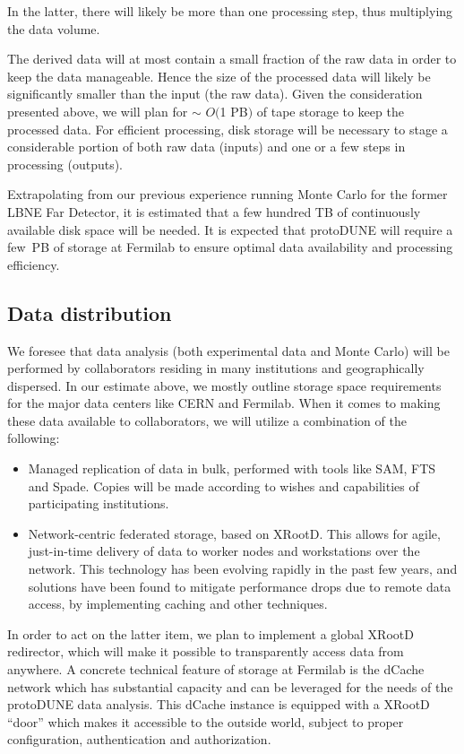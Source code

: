 In the latter, there will likely be more than one processing step, thus multiplying the data volume. 

The derived data will at most contain a small fraction of the raw data in order to keep the data manageable.
Hence the size of the processed data will likely be significantly smaller than the input (the raw data). 
Given the consideration presented above, we will plan for
$\sim$ $O($1 PB$)$ of tape storage to keep the processed data. 
For efficient processing, disk storage will be necessary
to stage a considerable portion of both raw data (inputs) and one or a few steps in processing (outputs).

Extrapolating from our previous experience running Monte Carlo for the former LBNE Far Detector, it is estimated
that  a few hundred TB of continuously available disk space will be needed. It is expected that protoDUNE will require
a few~PB of storage at Fermilab to ensure optimal data availability and  processing efficiency. 

\subsection{Data distribution}
We foresee that data analysis (both experimental data and Monte Carlo) will be performed by collaborators residing in many 
institutions and geographically dispersed. In our
estimate above, we mostly outline storage space requirements for the
major data centers like CERN and Fermilab. When it comes to making these data available to collaborators, we will utilize a combination of the following:
\begin{itemize}
\item Managed replication of data in bulk, performed with tools like SAM, FTS and Spade. Copies will be made according to wishes and capabilities of participating institutions.
\item Network-centric federated storage, based on XRootD. This allows for agile, just-in-time delivery of data to worker nodes and workstations over the network. This
technology has been evolving rapidly in the past few years, and solutions have been found to mitigate performance drops due to remote data access, by implementing caching and other techniques.
\end{itemize}

In order to act on the latter item, we plan to implement a global XRootD redirector, which will make it possible to transparently access data from anywhere.
A concrete technical feature of storage at Fermilab is the dCache network which has substantial capacity and can be leveraged
for the needs of the protoDUNE data analysis. This dCache instance is equipped with a XRootD ``door'' which makes it accessible to the outside world, subject
to proper configuration, authentication and authorization.


